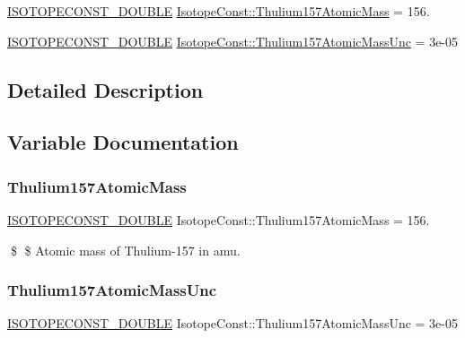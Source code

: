 \begin{DoxyCompactItemize}
\item 
\mbox{\hyperlink{group___isotope_const-_macros_ga8f45a7272ce02c0b4c65c44636ed719a}{I\+S\+O\+T\+O\+P\+E\+C\+O\+N\+S\+T\+\_\+\+D\+O\+U\+B\+LE}} \mbox{\hyperlink{group___isotope_const-_thulium-_tm157_gaa339a412584d2975c06a9a0274a22a6f}{Isotope\+Const\+::\+Thulium157\+Atomic\+Mass}} = 156.
\item 
\mbox{\hyperlink{group___isotope_const-_macros_ga8f45a7272ce02c0b4c65c44636ed719a}{I\+S\+O\+T\+O\+P\+E\+C\+O\+N\+S\+T\+\_\+\+D\+O\+U\+B\+LE}} \mbox{\hyperlink{group___isotope_const-_thulium-_tm157_gaa468a29bdc0a9a57b35aed2d4915a0c2}{Isotope\+Const\+::\+Thulium157\+Atomic\+Mass\+Unc}} = 3e-\/05
\end{DoxyCompactItemize}


\subsection{Detailed Description}


\subsection{Variable Documentation}
\mbox{\label{group___isotope_const-_thulium-_tm157_gaa339a412584d2975c06a9a0274a22a6f}} 
\subsubsection{\texorpdfstring{Thulium157\+Atomic\+Mass}{Thulium157AtomicMass}}
{\footnotesize\ttfamily \mbox{\hyperlink{group___isotope_const-_macros_ga8f45a7272ce02c0b4c65c44636ed719a}{I\+S\+O\+T\+O\+P\+E\+C\+O\+N\+S\+T\+\_\+\+D\+O\+U\+B\+LE}} Isotope\+Const\+::\+Thulium157\+Atomic\+Mass = 156.}

\$ \$ Atomic mass of Thulium-\/157 in amu. \mbox{\label{group___isotope_const-_thulium-_tm157_gaa468a29bdc0a9a57b35aed2d4915a0c2}} 
\subsubsection{\texorpdfstring{Thulium157\+Atomic\+Mass\+Unc}{Thulium157AtomicMassUnc}}
{\footnotesize\ttfamily \mbox{\hyperlink{group___isotope_const-_macros_ga8f45a7272ce02c0b4c65c44636ed719a}{I\+S\+O\+T\+O\+P\+E\+C\+O\+N\+S\+T\+\_\+\+D\+O\+U\+B\+LE}} Isotope\+Const\+::\+Thulium157\+Atomic\+Mass\+Unc = 3e-\/05}

